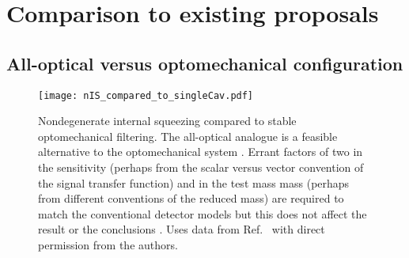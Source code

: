 




\section{Comparison to existing proposals}

\subsection{All-optical versus optomechanical configuration}

\begin{figure}
	\centering
	\texttt{[image: nIS\_compared\_to\_singleCav.pdf]}
	\caption{  Nondegenerate internal squeezing compared to stable optomechanical filtering. The all-optical analogue is a feasible alternative to the optomechanical system . Errant  factors of two in the sensitivity (perhaps from the scalar versus vector convention of the signal transfer function) and in the test mass mass (perhaps from different conventions of the reduced mass) are required to match the conventional detector models but this does not affect the result or the conclusions . Uses data from Ref.~\cite{} with direct permission from the authors.}
	\label{fig:}
\end{figure}


